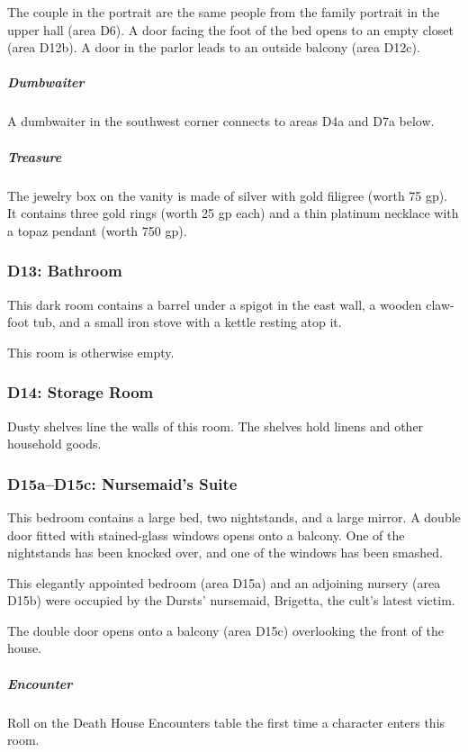 \documentclass[10pt,a4paper,twoside,bg=print,twocolumn,openany,nodeprecatedcode]{dndbook}
\begin{document}
The couple in the portrait are the same people from the family portrait in the upper hall (area D6). A door facing the foot of the bed opens to an empty closet (area D12b). A door in the parlor leads to an outside balcony (area D12c).

\subparagraph{Dumbwaiter}
A dumbwaiter in the southwest corner connects to areas D4a and D7a below.

\subparagraph{Treasure}
The jewelry box on the vanity is made of silver with gold filigree (worth 75 gp). It contains three gold rings (worth 25 gp each) and a thin platinum necklace with a topaz pendant (worth 750 gp).

\subsubsection{D13: Bathroom}
\begin{DndReadAloud}{}
This dark room contains a barrel under a spigot in the east wall, a wooden claw-foot tub, and a small iron stove with a kettle resting atop it.

\end{DndReadAloud}

This room is otherwise empty.

\subsubsection{D14: Storage Room}
Dusty shelves line the walls of this room. The shelves hold linens and other household goods.

\subsubsection{D15a–D15c: Nursemaid's Suite}
\begin{DndReadAloud}{}
This bedroom contains a large bed, two nightstands, and a large mirror. A double door fitted with stained-glass windows opens onto a balcony. One of the nightstands has been knocked over, and one of the windows has been smashed.

\end{DndReadAloud}

This elegantly appointed bedroom (area D15a) and an adjoining nursery (area D15b) were occupied by the Dursts' nursemaid, Brigetta, the cult's latest victim.

The double door opens onto a balcony (area D15c) overlooking the front of the house.

\subparagraph{Encounter}
Roll on the Death House Encounters table the first time a character enters this room.
\end{document}
